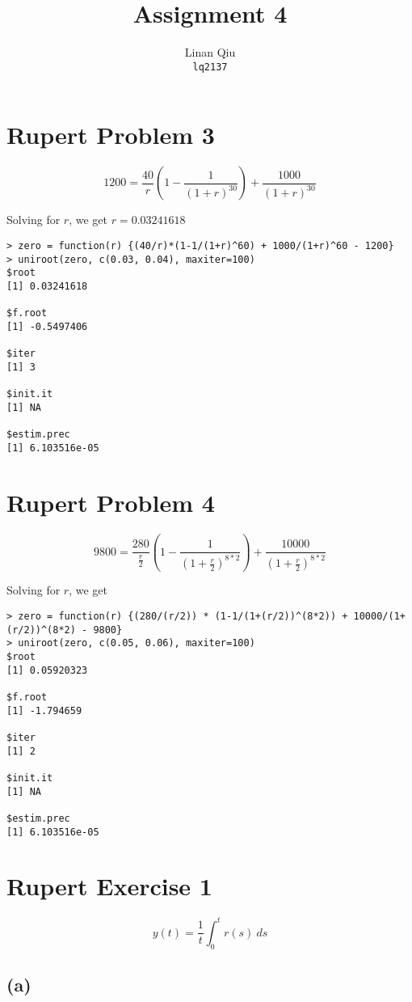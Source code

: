 \documentclass[11pt]{scrartcl}
\title{Assignment 4}
\author{Linan Qiu\\\texttt{lq2137}}
\begin{document}
\maketitle

\section*{Rupert Problem 3}

\[1200 = \frac{40}{r}\left(1 - \frac{1}{(1+r)^{30}} \right) + \frac{1000}{(1+r)^{30}}\]

Solving for $r$, we get $r=0.03241618$

\begin{lstlisting}
> zero = function(r) {(40/r)*(1-1/(1+r)^60) + 1000/(1+r)^60 - 1200}
> uniroot(zero, c(0.03, 0.04), maxiter=100)
$root
[1] 0.03241618

$f.root
[1] -0.5497406

$iter
[1] 3

$init.it
[1] NA

$estim.prec
[1] 6.103516e-05
\end{lstlisting}

\section*{Rupert Problem 4}

\[9800 = \frac{280}{\frac{r}{2}} \left(1-\frac{1}{\left(1+\frac{r}{2}\right)^{8*2}}\right) + \frac{10000}{\left(1+\frac{r}{2}\right)^{8*2}}\]

Solving for $r$, we get

\begin{lstlisting}
> zero = function(r) {(280/(r/2)) * (1-1/(1+(r/2))^(8*2)) + 10000/(1+(r/2))^(8*2) - 9800}
> uniroot(zero, c(0.05, 0.06), maxiter=100)
$root
[1] 0.05920323

$f.root
[1] -1.794659

$iter
[1] 2

$init.it
[1] NA

$estim.prec
[1] 6.103516e-05
\end{lstlisting}

\section*{Rupert Exercise 1}

\[y(t) = \frac{1}{t} \int_0^t r(s) \: ds\]

\subsection*{(a)}
\end{document}
